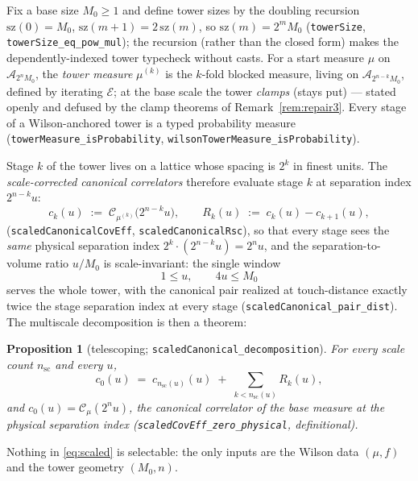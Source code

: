 \documentclass[11pt]{article}
\newtheorem{proposition}[theorem]{Proposition}
\theoremstyle{definition}
\newcommand{\lean}[1]{\texttt{#1}}
\newcommand{\Conf}[1]{\mathcal{A}_{#1}}
\newcommand{\Cov}{\mathcal{C}}
\begin{document}
Fix a base size $M_0 \ge 1$ and define tower sizes by the doubling
recursion $\mathrm{sz}(0) = M_0$,
$\mathrm{sz}(m+1) = 2\, \mathrm{sz}(m)$, so
$\mathrm{sz}(m) = 2^m M_0$ (\lean{towerSize},
\lean{towerSize\_eq\_pow\_mul}); the recursion (rather than the closed
form) makes the dependently-indexed tower typecheck without casts.
For a start measure $\mu$ on $\Conf{2^n M_0}$, the \emph{tower
measure} $\mu^{(k)}$ is the $k$-fold blocked measure, living on
$\Conf{2^{n-k} M_0}$, defined by iterating $\mathcal{E}$; at the base
scale the tower \emph{clamps} (stays put) --- stated openly and
defused by the clamp theorems of Remark~\ref{rem:repair3}.  Every
stage of a Wilson-anchored tower is a typed probability measure
(\lean{towerMeasure\_isProbability},
\lean{wilsonTowerMeasure\_isProbability}).

Stage $k$ of the tower lives on a lattice whose spacing is $2^k$ in
finest units.  The \emph{scale-corrected canonical correlators}
therefore evaluate stage $k$ at separation index $2^{n-k} u$:
\begin{equation}\label{eq:scaled}
c_k(u) \;:=\; \Cov_{\mu^{(k)}}\bigl(2^{n-k} u\bigr), \qquad
R_k(u) \;:=\; c_k(u) - c_{k+1}(u),
\end{equation}
(\lean{scaledCanonicalCovEff}, \lean{scaledCanonicalRsc}), so that
every stage sees the \emph{same} physical separation index
$2^k \cdot (2^{n-k} u) = 2^n u$, and the separation-to-volume ratio
$u / M_0$ is scale-invariant: the single window
\begin{equation}\label{eq:window}
1 \le u, \qquad 4u \le M_0
\end{equation}
serves the whole tower, with the canonical pair realized at
touch-distance exactly twice the stage separation index at every stage
(\lean{scaledCanonical\_pair\_dist}).  The multiscale decomposition is
then a theorem:

\begin{proposition}[telescoping; \lean{scaledCanonical\_decomposition}]
\label{prop:telescope}
For every scale count $n_{\mathrm{sc}}$ and every $u$,
\[
c_0(u) \;=\; c_{n_{\mathrm{sc}}(u)}(u)
  \;+\; \sum_{k < n_{\mathrm{sc}}(u)} R_k(u),
\]
and $c_0(u) = \Cov_{\mu}(2^n u)$, the canonical correlator of the
\emph{base} measure at the physical separation index
(\lean{scaledCovEff\_zero\_physical}, definitional).
\end{proposition}

Nothing in \eqref{eq:scaled} is selectable: the only inputs are the
Wilson data $(\mu, f)$ and the tower geometry $(M_0, n)$.
\end{document}
